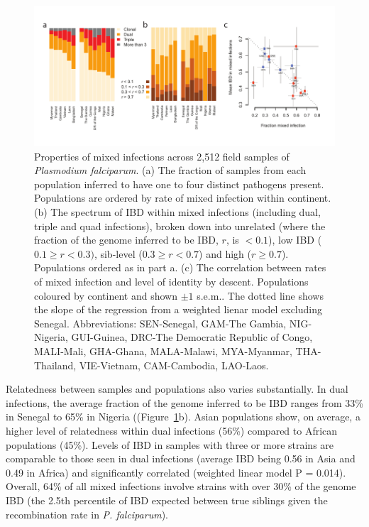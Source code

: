 \documentclass[9pt,lineno]{elife}
\begin{document}
\begin{figure}[ht]
  \begin{center}
    \includegraphics[width=\textwidth]{Figure3.pdf}
    \caption{Properties of mixed infections across 2,512 field samples of {\it Plasmodium falciparum}. (a) The fraction of samples from each population inferred to have one to four distinct pathogens present.  Populations are ordered by rate of mixed infection within continent. (b) The spectrum of IBD within mixed infections (including dual, triple and quad infections), broken down into unrelated (where the fraction of the genome inferred to be IBD, $r$, is $< 0.1$), low IBD ($0.1 \geq r < 0.3)$, sib-level ($0.3 \geq r<0.7$) and high ($r \geq 0.7$).  Populations ordered as in part a. (c) The correlation between rates of mixed infection and level of identity by descent. Populations coloured by continent and shown $\pm 1$ s.e.m..  The dotted line shows the slope of the regression from a weighted lienar model excluding Senegal.  Abbreviations: SEN-Senegal, GAM-The Gambia, NIG-Nigeria, GUI-Guinea, DRC-The Democratic Republic of Congo, MALI-Mali, GHA-Ghana, MALA-Malawi, MYA-Myanmar, THA-Thailand, VIE-Vietnam, CAM-Cambodia, LAO-Laos.} \label{fig:mixInfPlot}
  \end{center}
\end{figure}


Relatedness between samples and populations also varies substantially.  In dual infections, the average fraction of the genome inferred to be IBD ranges from 33\% in Senegal to 65\% in Nigeria ((Figure~\ref{fig:mixInfPlot}b).   Asian populations show, on average, a higher level of relatedness within dual infections (56\%) compared to African populations (45\%).  Levels of IBD in samples with three or more strains are comparable to those seen in dual infections (average IBD being 0.56 in Asia and 0.49 in Africa) and significantly correlated (weighted linear model P = 0.014).  Overall, 64\% of all mixed infections involve strains with over 30\% of the genome IBD (the 2.5th percentile of IBD expected between true siblings given the recombination rate in {\it P. falciparum}).
\end{document}

